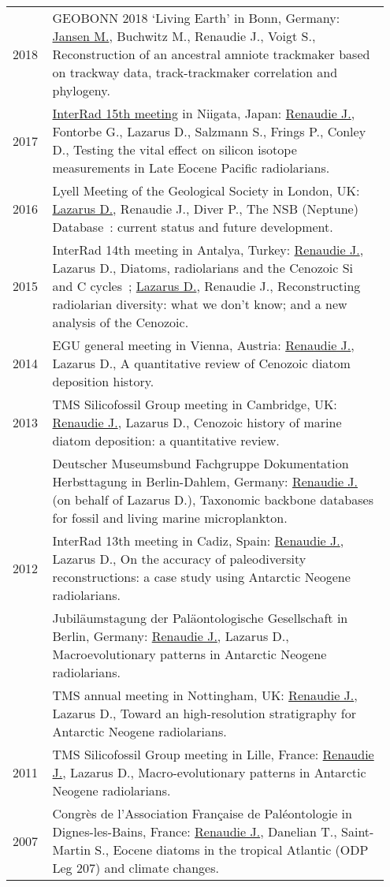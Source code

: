 \documentclass[11pt, a4paper]{article}
\begin{document}
\begin{longtable}{@{}p{0.1\linewidth} P{0.85\linewidth}@{}}
2018 & GEOBONN 2018 `Living Earth' in Bonn, Germany: \underline{Jansen M.}, Buchwitz M., Renaudie J., Voigt S., Reconstruction of an ancestral amniote trackmaker based on trackway data, track-trackmaker correlation and phylogeny.\\
2017 & \href{http://interrad2017.random-walk.org/wp-content/uploads/2017/10/Abstracts_InterRadXV_171016b.pdf}{InterRad 15th meeting} in Niigata, Japan: \underline{Renaudie J.}, Fontorbe G., Lazarus D., Salzmann S., Frings P., Conley D., Testing the vital effect on silicon isotope measurements in Late Eocene Pacific radiolarians.\\
2016 & Lyell Meeting of the Geological Society in London, UK: \underline{Lazarus D.}, Renaudie J., Diver P., The NSB (Neptune) Database : current status and future development.\\
2015 & InterRad 14th meeting in Antalya, Turkey: \underline{Renaudie J.}, Lazarus D., Diatoms, radiolarians and the Cenozoic Si and C cycles ; \underline{Lazarus D.}, Renaudie J., Reconstructing radiolarian diversity: what we don't know; and a new analysis of the Cenozoic.\\
2014 & EGU general meeting in Vienna, Austria: \underline{Renaudie J.}, Lazarus D., A quantitative review of Cenozoic diatom deposition history.\\
2013 & TMS Silicofossil Group meeting in Cambridge, UK: \underline{Renaudie J.}, Lazarus D., Cenozoic history of marine diatom deposition: a quantitative review.\\
 & Deutscher Museumsbund Fachgruppe Dokumentation Herbsttagung in Berlin-Dahlem, Germany: \underline{Renaudie J.} (on behalf of Lazarus D.), Taxonomic backbone databases for fossil and living marine microplankton.\\
2012 & InterRad 13th meeting in Cadiz, Spain: \underline{Renaudie J.}, Lazarus D., On the accuracy of paleodiversity reconstructions: a case study using Antarctic Neogene radiolarians.\\
 & Jubil\"{a}umstagung der Pal\"{a}ontologische Gesellschaft in Berlin, Germany: \underline{Renaudie J.}, Lazarus D., Macroevolutionary patterns in Antarctic Neogene radiolarians.\\
 & TMS annual meeting in Nottingham, UK: \underline{Renaudie J.}, Lazarus D., Toward an high-resolution stratigraphy for Antarctic Neogene radiolarians.\\
2011 & TMS Silicofossil Group meeting in Lille, France: \underline{Renaudie J.}, Lazarus D., Macro-evolutionary patterns in Antarctic Neogene radiolarians.\\
2007 & Congr\`{e}s de l'Association Fran\c{c}aise de Pal\'{e}ontologie in Dignes-les-Bains, France: \underline{Renaudie J.}, Danelian T., Saint-Martin S., Eocene diatoms in the tropical Atlantic (ODP Leg 207) and climate changes.\\
\end{longtable}
\end{document}
